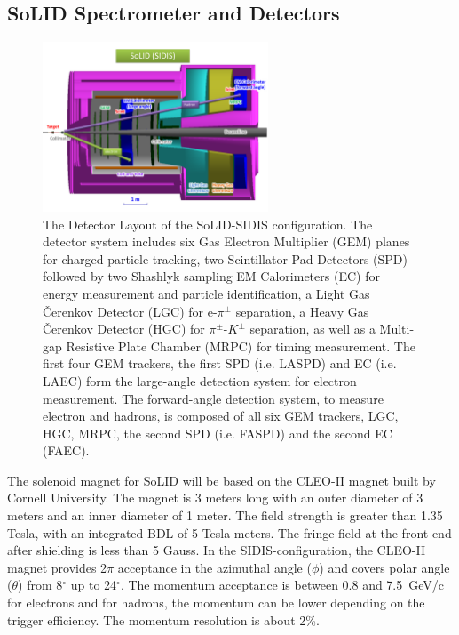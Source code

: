 \subsection {SoLID Spectrometer and Detectors} 
\begin{figure}[!ht]
 \begin{center}
  \includegraphics[width=0.6\textwidth]{./figures/SoLID_SIDIS_setup.pdf}
   \caption[The Detector Layout of the SoLID-SIDIS
     configuration]{\footnotesize{The Detector Layout of the SoLID-SIDIS
       configuration. The detector system includes six Gas Electron Multiplier
       (GEM) planes for charged particle tracking, two Scintillator Pad
       Detectors (SPD) followed by two Shashlyk sampling EM Calorimeters (EC)
       for energy measurement and particle identification, a Light Gas
       \v{C}erenkov Detector (LGC) for e-$\pi^{\pm}$ separation, a Heavy Gas
       \v{C}erenkov Detector (HGC) for $\pi^{\pm}$-$K^{\pm}$ separation, as
       well as a Multi-gap Resistive Plate Chamber (MRPC) for timing
       measurement. The first four GEM trackers, the first SPD (i.e. LASPD) and
       EC (i.e. LAEC) form the large-angle detection system for electron
       measurement. The forward-angle detection system, to measure electron and
       hadrons, is composed of all six GEM trackers, LGC, HGC, MRPC, the second
       SPD (i.e. FASPD) and the second EC (FAEC).}}
   \label{solid_sidis}
 \end{center}
\end{figure}
The solenoid magnet for SoLID will be based on the CLEO-II magnet built by
Cornell University. The magnet is 3 meters long with an outer diameter of 3
meters and an inner diameter of 1 meter. The field strength is greater than
1.35 Tesla, with an integrated BDL of 5 Tesla-meters. The fringe field at the
front end after shielding is less than 5 Gauss. In the SIDIS-configuration, the
CLEO-II magnet provides 2$\pi$ acceptance in the azimuthal angle ($\phi$) and
covers polar angle ($\theta$) from 8$^{\circ}$ up to 24$^{\circ}$. The
momentum acceptance is between 0.8 and 7.5~GeV/c for electrons and for hadrons,
the momentum can be lower depending on the trigger efficiency.  The momentum
resolution is about 2\%.

